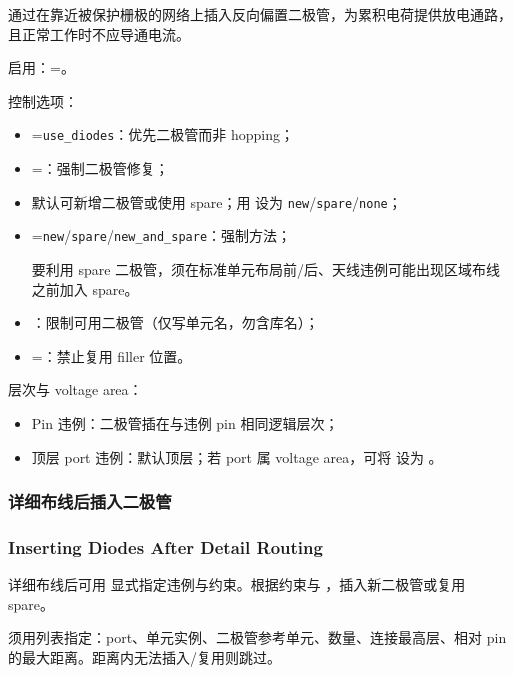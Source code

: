 通过在靠近被保护栅极的网络上插入反向偏置二极管，为累积电荷提供放电通路，且正常工作时不应导通电流。

启用：=。

控制选项：
\begin{itemize}
  \item {}=\texttt{use\_diodes}：优先二极管而非 hopping；
  \item {}=：强制二极管修复；
  \item 默认可新增二极管或使用 spare；用  设为 \texttt{new}/\texttt{spare}/\texttt{none}；
  \item {}=\texttt{new}/\texttt{spare}/\texttt{new\_and\_spare}：强制方法；
\begin{noteBox}
要利用 spare 二极管，须在标准单元布局前/后、天线违例可能出现区域布线之前加入 spare。
\end{noteBox}
  \item {}：限制可用二极管（仅写单元名，勿含库名）；
  \item {}=：禁止复用 filler 位置。
\end{itemize}

层次与 voltage area：
\begin{itemize}
  \item Pin 违例：二极管插在与违例 pin 相同逻辑层次；
  \item 顶层 port 违例：默认顶层；若 port 属 voltage area，可将  设为 。
\end{itemize}

\subsubsection{详细布线后插入二极管}
\subsubsection*{Inserting Diodes After Detail Routing}

详细布线后可用  显式指定违例与约束。根据约束与 ，插入新二极管或复用 spare。

须用列表指定：port、单元实例、二极管参考单元、数量、连接最高层、相对 pin 的最大距离。距离内无法插入/复用则跳过。

